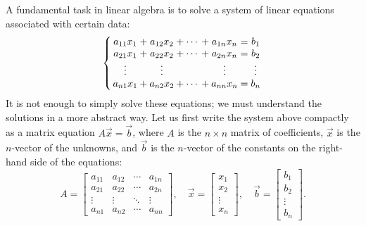 \documentclass{ximera}
\begin{document}
A fundamental task in linear algebra is to solve a system of linear
equations associated with certain data:
\begin{equation*}
  \left\{ \,
  \begin{array}{*{9}{@{}c@{}}}
    a_{11} x_1      & {}+{} & a_{12} x_2 & {}+{} & \cdots & {}+{} & a_{1n} x_n
                    &
    {}\mathrel{=}{} & b_1
    \\
    a_{21} x_1      & {}+{} & a_{22} x_2 & {}+{} & \cdots & {}+{} & a_{2n} x_n
                    &
    {}\mathrel{=}{} & b_2
    \\
    \vdots          &       & \vdots     &       &        &       & \vdots
                    &       & \vdots
    \\
    a_{n1} x_1      & {}+{} & a_{n2} x_2 & {}+{} & \cdots & {}+{} & a_{nn} x_n
                    &
    {}\mathrel{=}{} & b_n
  \end{array}
  \, \right.
\end{equation*}
It is not enough to simply solve these equations; we must understand
the solutions in a more abstract way. Let us first write the system
above compactly as a matrix equation $A \vec{x} = \vec{b}$, where $A$
is the $n \times n$ matrix of coefficients, $\vec{x}$ is the
$n$-vector of the unknowns, and $\vec{b}$ is the $n$-vector of the constants on
the
right-hand side of the equations:
\[
  A =
  \begin{bmatrix}
    a_{11} & a_{12} & \cdots & a_{1n} \\
    a_{21} & a_{22} & \cdots & a_{2n} \\
    \vdots & \vdots & \ddots & \vdots \\
    a_{n1} & a_{n2} & \cdots & a_{nn}
  \end{bmatrix}, \quad
  \vec{x} =
  \begin{bmatrix}
    x_1 \\ x_2 \\ \vdots \\ x_n
  \end{bmatrix}, \quad
  \vec{b} =
  \begin{bmatrix}
    b_1 \\ b_2 \\ \vdots \\ b_n
  \end{bmatrix}.
\]
\end{document}
